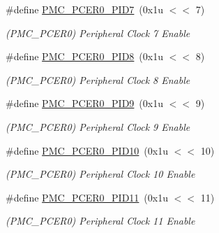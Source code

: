 \begin{DoxyCompactItemize}
\mbox{\label{group__SAME70__PMC_ga65f9177c03d2f671c8eb80a60592defb}} 
\#define \mbox{\hyperlink{group__SAME70__PMC_ga65f9177c03d2f671c8eb80a60592defb}{P\+M\+C\+\_\+\+P\+C\+E\+R0\+\_\+\+P\+I\+D7}}~(0x1u $<$$<$ 7)
\begin{DoxyCompactList}\small\item\em (P\+M\+C\+\_\+\+P\+C\+E\+R0) Peripheral Clock 7 Enable \end{DoxyCompactList}\item 
\mbox{\label{group__SAME70__PMC_ga7cf79cd20d5b5286d828f43bbea5bdb6}} 
\#define \mbox{\hyperlink{group__SAME70__PMC_ga7cf79cd20d5b5286d828f43bbea5bdb6}{P\+M\+C\+\_\+\+P\+C\+E\+R0\+\_\+\+P\+I\+D8}}~(0x1u $<$$<$ 8)
\begin{DoxyCompactList}\small\item\em (P\+M\+C\+\_\+\+P\+C\+E\+R0) Peripheral Clock 8 Enable \end{DoxyCompactList}\item 
\mbox{\label{group__SAME70__PMC_gabda1de707ed60eb6cf4989c63f0c834c}} 
\#define \mbox{\hyperlink{group__SAME70__PMC_gabda1de707ed60eb6cf4989c63f0c834c}{P\+M\+C\+\_\+\+P\+C\+E\+R0\+\_\+\+P\+I\+D9}}~(0x1u $<$$<$ 9)
\begin{DoxyCompactList}\small\item\em (P\+M\+C\+\_\+\+P\+C\+E\+R0) Peripheral Clock 9 Enable \end{DoxyCompactList}\item 
\mbox{\label{group__SAME70__PMC_gab8555796956459c17ec1dc31e355b6cd}} 
\#define \mbox{\hyperlink{group__SAME70__PMC_gab8555796956459c17ec1dc31e355b6cd}{P\+M\+C\+\_\+\+P\+C\+E\+R0\+\_\+\+P\+I\+D10}}~(0x1u $<$$<$ 10)
\begin{DoxyCompactList}\small\item\em (P\+M\+C\+\_\+\+P\+C\+E\+R0) Peripheral Clock 10 Enable \end{DoxyCompactList}\item 
\mbox{\label{group__SAME70__PMC_gab4a377380f7e755be2648d7654a65a63}} 
\#define \mbox{\hyperlink{group__SAME70__PMC_gab4a377380f7e755be2648d7654a65a63}{P\+M\+C\+\_\+\+P\+C\+E\+R0\+\_\+\+P\+I\+D11}}~(0x1u $<$$<$ 11)
\begin{DoxyCompactList}\small\item\em (P\+M\+C\+\_\+\+P\+C\+E\+R0) Peripheral Clock 11 Enable \end{DoxyCompactList}\item 
$$
\end{DoxyCompactItemize}
